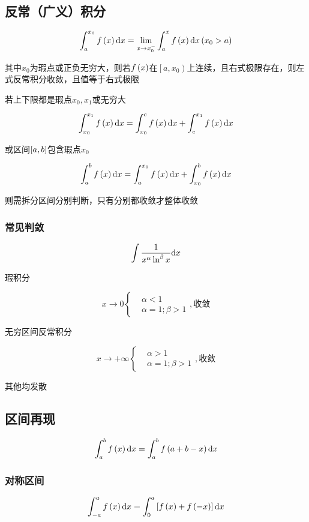 \documentclass{article}
\begin{document}
\subsection{反常（广义）积分}

\[\int_a^{x_0}f\left(x\right)\mathrm d x=\lim_{x\to x_0^-}\int_a^x f\left(x\right)\mathrm d x\left(x_0>a\right)\]

其中$x_0$为瑕点或正负无穷大，则若$f\left(x\right)$在$\left[a,x_0\right)$上连续，且右式极限存在，则左式反常积分收敛，且值等于右式极限

若上下限都是瑕点$x_0,x_1$或无穷大

\[\int_{x_0}^{x_1}f\left(x\right)\mathrm d x=\int_{x_0}^cf\left(x\right)\mathrm d x+\int_c^{x_1}f\left(x\right)\mathrm d x\]

或区间$\left[a,b\right]$包含瑕点$x_0$

\[\int_a^bf\left(x\right)\mathrm d x=\int_a^{x_0}f\left(x\right)\mathrm d x+\int_{x_0}^bf\left(x\right)\mathrm d x\]

则需拆分区间分别判断，只有分别都收敛才整体收敛

\subsubsection{常见判敛}

\[\int\frac1{x^\alpha\ln^\beta x}\mathrm d x\]

瑕积分

\[x\to0\left\{\begin{aligned}
         & \alpha<1         \\
         & \alpha=1;\beta>1
    \end{aligned}\right.,\text{收敛}\]

无穷区间反常积分

\[x\to+\infty\left\{\begin{aligned}
         & \alpha>1         \\
         & \alpha=1;\beta>1
    \end{aligned}\right.,\text{收敛}\]

其他均发散

\subsection{区间再现}

\[\int_a^bf\left(x\right)\mathrm d x=\int_a^bf\left(a+b-x\right)\mathrm d x\]

\subsubsection{对称区间}

\[\int_{-a}^af\left(x\right)\mathrm d x=\int_0^a\left[f\left(x\right)+f\left(-x\right)\right]\mathrm d x\]
\end{document}
